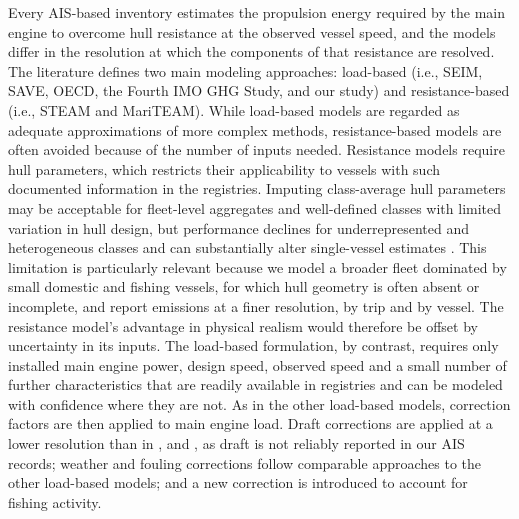 Every AIS-based inventory estimates the propulsion energy required by the main engine to overcome hull resistance at the observed vessel speed, and the models differ in the resolution at which the components of that resistance are resolved. The literature defines two main modeling approaches: load-based (i.e., SEIM, SAVE, OECD, the Fourth IMO GHG Study, and our study) and resistance-based (i.e., STEAM and MariTEAM). While load-based models are regarded as adequate approximations of more complex methods, resistance-based models are often avoided because of the number of inputs needed. Resistance models require hull parameters, which restricts their applicability to vessels with such documented information in the registries. Imputing class-average hull parameters may be acceptable for fleet-level aggregates and well-defined classes with limited variation in hull design, but performance declines for underrepresented and heterogeneous classes and can substantially alter single-vessel estimates \cite{brownPowerModelsAverage2019}. This limitation is particularly relevant because we model a broader fleet dominated by small domestic and fishing vessels, for which hull geometry is often absent or incomplete, and report emissions at a finer resolution, by trip and by vessel. The resistance model's advantage in physical realism would therefore be offset by uncertainty in its inputs. The load-based formulation, by contrast, requires only installed main engine power, design speed, observed speed and a small number of further characteristics that are readily available in registries and can be modeled with confidence where they are not. As in the other load-based models, correction factors are then applied to main engine load. Draft corrections are applied at a lower resolution than in \cite{fourth2020greenhouse}, \cite{documentationV2025031Documentation} and \cite{oecdMaritimeTransportCO2Methodology2025}, as draft is not reliably reported in our AIS records; weather and fouling corrections follow comparable approaches to the other load-based models; and a new correction is introduced to account for fishing activity.

